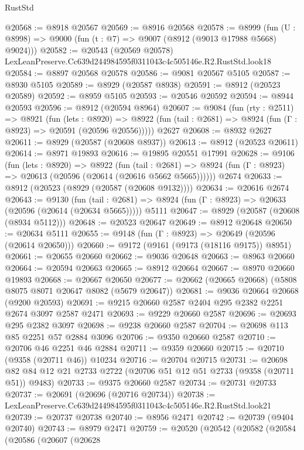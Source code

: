\begin{lexlean}{RustStd}
\begin{coremodule}
@20568 := @8918 @20567
@20569 := @8916 @20568
@20578 := @8999
    (fun (U : @8998) => @9000 (fun (t : @7) => @9007 (@8912 (@9013 @17988 @5668) @9024)))
@20582 := @20543 (@20569 @20578) LexLeanPreserve.Cc639d244984595f0311043c4c505146e.R2.RustStd.look18
@20584 := @8897 @20568 @20578
@20586 := @9081 @20567 @5105
@20587 := @8930 @5105
@20589 := @8929 (@20587 @8938)
@20591 := @8912 (@20523 @20589)
@20592 := @8959 @5105
@20593 := @20546 @20592
@20594 := @8944 @20593
@20596 := @8912 (@20594 @8964)
@20607 := @9084
    (fun (rty : @2511) =>
    @8921
      (fun (lets : @8920) =>
      @8922 (fun (tail : @2681) => @8924 (fun (Γ : @8923) => @20591 (@20596 @20556)))))
    @2627
@20608 := @8932 @2627
@20611 := @8929 (@20587 (@20608 @8937))
@20613 := @8912 (@20523 @20611)
@20614 := @8971 @19893
@20616 := @19895 @20551 @17991
@20628 := @9106
    (fun (lets : @8920) =>
    @8922
      (fun (tail : @2681) =>
      @8924 (fun (Γ : @8923) => @20613 (@20596 (@20614 (@20616 @5662 @5665))))))
    @2674
@20633 := @8912 (@20523 (@8929 (@20587 (@20608 @9132))))
@20634 := @20616 @2674
@20643 := @9130
    (fun (tail : @2681) => @8924 (fun (Γ : @8923) => @20633 (@20596 (@20614 (@20634 @5665)))))
    @5111
@20647 := @8929 (@20587 (@20608 (@8934 @5112)))
@20648 := @20523 @20647
@20649 := @8912 @20648
@20650 := @20634 @5111
@20655 := @9148 (fun (Γ : @8923) => @20649 (@20596 (@20614 @20650)))
@20660 := @9172 (@9161 (@9173 (@18116 @9175)) @8951)
@20661 := @20655 @20660
@20662 := @9036 @20648
@20663 := @8963 @20660
@20664 := @20594 @20663
@20665 := @8912 @20664
@20667 := @8970 @20660 @19893
@20668 := @20667 @20650
@20677 := @20662 (@20665 @20668) (@5808 @8075 @8071 @20647 @8082 (@5679 @20647))
@20681 := @9036 @20664 @20668 (@9200 @20593)
@20691 := @9215 @20660 @2587 @2404 @295 @2382 @2251 @2674 @3097 @2587 @2471
@20693 := @9229 @20660 @2587
@20696 := @20693 @295 @2382 @3097
@20698 := @9238 @20660 @2587
@20704 := @20698 @113 @85 @2251 @57 @2884 @3096
@20706 := @9350 @20660 @2587
@20710 := @20706 @46 @2251 @46 @2884
@20711 := @9359 @20660
@20715 := @20710 (@9358 (@20711 @46)) @10234
@20716 := @20704 @20715
@20731 := @20698 @82 @84 @12 @21 @2733 @2722 (@20706 @51 @12 @51 @2733 (@9358 (@20711 @51)) @9483)
@20733 := @9375 @20660 @2587
@20734 := @20731 @20733
@20737 := @20691 (@20696 (@20716 @20734))
@20738 := LexLeanPreserve.Cc639d244984595f0311043c4c505146e.R2.RustStd.look21
@20739 := @20737 @20738
@20740 := @8956 @2471
@20742 := @20739 (@9404 @20740)
@20743 := @8979 @2471
@20759 := @20520
    (@20542
      (@20582
        (@20584
          (@20586
            (@20607
              (@20628

\end{coremodule}
\end{lexlean}
